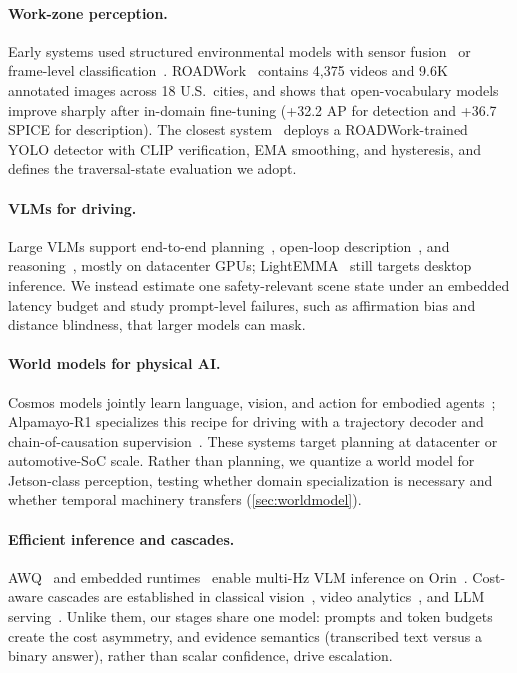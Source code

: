 \documentclass[journal]{IEEEtran}
\begin{document}
\paragraph{Work-zone perception.} Early systems used structured environmental models with sensor fusion~\cite{shi2021workzone} or frame-level classification~\cite{abodo2018shrp}.  ROADWork~\cite{ghosh2025roadwork} contains 4{,}375 videos and 9.6K annotated images across 18 U.S.\ cities, and shows that open-vocabulary models improve sharply after in-domain fine-tuning (+32.2 AP for detection and +36.7 SPICE for description).  The closest system~\cite{priorsystem2026} deploys a ROADWork-trained YOLO detector with CLIP verification, EMA smoothing, and hysteresis, and defines the traversal-state evaluation we adopt.

\paragraph{VLMs for driving.} Large VLMs support end-to-end planning~\cite{hwang2024emma,tian2024drivevlm}, open-loop description~\cite{marcu2024lingoqa}, and reasoning~\cite{nvidia2025cosmosreason}, mostly on datacenter GPUs; LightEMMA~\cite{lightemma2025} still targets desktop inference.  We instead estimate one safety-relevant scene state under an embedded latency budget and study prompt-level failures, such as affirmation bias and distance blindness, that larger models can mask.

\paragraph{World models for physical AI.} Cosmos models jointly learn language, vision, and action for embodied agents~\cite{nvidia2025cosmosreason,nvidia2026cosmos3}; Alpamayo-R1 specializes this recipe for driving with a trajectory decoder and chain-of-causation supervision~\cite{alpamayo2026}.  These systems target planning at datacenter or automotive-SoC scale.  Rather than planning, we quantize a world model for Jetson-class perception, testing whether domain specialization is necessary and whether temporal machinery transfers (\cref{sec:worldmodel}).

\paragraph{Efficient inference and cascades.} AWQ~\cite{lin2024awq} and embedded runtimes~\cite{trtedgellm} enable multi-Hz VLM inference on Orin~\cite{chu2024mobilevlm,lin2024vila}.  Cost-aware cascades are established in classical vision~\cite{viola2001rapid}, video analytics~\cite{kang2017noscope}, and LLM serving~\cite{chen2023frugalgpt,gatekeeper2025}.  Unlike them, our stages share one model: prompts and token budgets create the cost asymmetry, and evidence semantics (transcribed text versus a binary answer), rather than scalar confidence, drive escalation.
\end{document}
